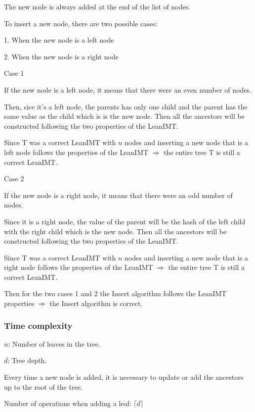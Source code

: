 \documentclass{article}
\begin{document}
The new node is always added at the end of the list of nodes.

To insert a new node, there are two possible cases:

1. When the new node is a left node

2. When the new node is a right node

Case 1

If the new node is a left node, it means that there were an even number of nodes.

Then, sice it's a left node, the parents has only one child and the parent has the same value as the child which is is the new node. Then all the ancestors will be constructed following the two properties of the LeanIMT.

Since T was a correct LeanIMT with $n$ nodes and inserting a new node that is a left node follows the properties of the LeanIMT $\Rightarrow$ the entire tree T is still a correct LeanIMT.

Case 2

If the new node is a right node, it means that there were an odd number of nodes.

Since it is a right node, the value of the parent will be the hash of the left child with the right child which is the new node. Then all the ancestors will be constructed following the two properties of the LeanIMT.

Since T was a correct LeanIMT with $n$ nodes and inserting a new node that is a right node follows the properties of the LeanIMT $\Rightarrow$ the entire tree T is still a correct LeanIMT.

Then for the two cases 1 and 2 the Insert algorithm follows the LeanIMT properties $\Rightarrow$ the Insert algorithm is correct.

\bigbreak

\subsubsection{Time complexity}

\bigbreak

$n$: Number of leaves in the tree.

$d$: Tree depth.

\bigbreak

Every time a new node is added, it is necessary to update or add the ancestors up to the root of the tree.

\bigbreak
\label{InsertProof}
Number of operations when adding a leaf: $\lceil d \rceil$
\end{document}
